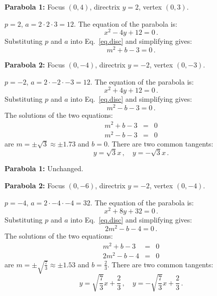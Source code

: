 \newpage

\begin{example}\mbox{}

\noindent\textbf{Parabola 1:} Focus $(0,4)$, directrix $y=2$, vertex $(0,3)$.

\noindent{}$p=2$, $a=2\cdot 2\cdot 3=12$. The equation of the parabola is:
\[
x^2-4y +12=0\,.
\]
Substituting $p$ and $a$ into Eq.~\ref{eq.disc} and simplifying gives:
\[
m^2+b-3=0\,.
\]

\noindent\textbf{Parabola 2:} Focus $(0,-4)$, directrix $y=-2$, vertex $(0,-3)$.

\noindent{}$p=-2$, $a=2\cdot -2\cdot -3=12$. The equation of the parabola is:
\[
x^2+4y+12=0\,.
\]
Substituting $p$ and $a$ into Eq.~\ref{eq.disc} and simplifying gives:
\[
m^2-b-3=0\,.
\]
The solutions of the two equations:
\begin{eqnarray*}
m^2+b-3&=&0\\
m^2-b-3&=&0
\end{eqnarray*}
are $m=\pm\sqrt{3}\approx \pm 1.73$ and $b=0$. There are two common tangents:
\[
y=\sqrt{3}x\,,\quad y=-\sqrt{3}x\,.
\]
\end{example}

\begin{example}\mbox{}

\noindent\textbf{Parabola 1:}
Unchanged.

\noindent\textbf{Parabola 2:} Focus $(0,-6)$, directrix $y=-2$, vertex $(0,-4)$.

\noindent{}$p=-4$, $a=2\cdot -4\cdot -4=32$. The equation of the parabola is:
\[
x^2+8y +32=0\,.
\]
Substituting $p$ and $a$ into Eq.~\ref{eq.disc} and simplifying gives:
\[
2m^2-b-4=0\,.
\]
The solutions of the two equations:
\begin{eqnarray*}
m^2+b-3&=&0\\
2m^2-b-4&=&0
\end{eqnarray*}
are $m=\pm\sqrt{\displaystyle\frac{7}{3}}\approx \pm 1.53$ and $b=\displaystyle\frac{2}{3}$. There are two common tangents:
\[
y=\sqrt{\frac{7}{3}}x+\frac{2}{3}\,,\quad y=-\sqrt{\frac{7}{3}}x+\frac{2}{3}\,.
\]
\end{example}


